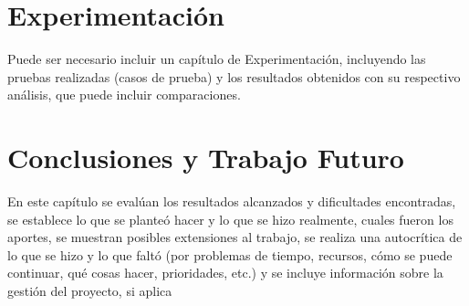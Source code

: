 \documentclass{prgrado}
\begin{document}

\chapter{Experimentación}
Puede ser necesario incluir un capítulo de Experimentación, incluyendo las pruebas realizadas (casos de prueba) y los resultados obtenidos con su respectivo análisis, que puede incluir comparaciones. 


\chapter{Conclusiones y Trabajo Futuro}

En este capítulo se evalúan los resultados alcanzados y
dificultades encontradas, se establece lo que se planteó hacer y lo que se hizo
realmente, cuales fueron los aportes, se muestran posibles extensiones al trabajo, se
realiza una autocrítica de lo que se hizo y lo que faltó (por problemas de tiempo,
recursos, cómo se puede continuar, qué cosas hacer, prioridades, etc.) y se incluye
información sobre la gestión del proyecto, si aplica


{ %

\backmatter %


\newpage



} %


\end{document}
